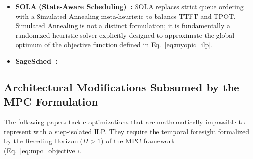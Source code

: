 \documentclass[11pt]{article}
\begin{document}
\begin{itemize}
    \item \textbf{SOLA (State-Aware Scheduling)~\citep{huang2025slo}:} SOLA replaces strict queue ordering with a Simulated Annealing meta-heuristic to balance TTFT and TPOT. Simulated Annealing is not a distinct formulation; it is fundamentally a randomized heuristic solver explicitly designed to approximate the global optimum of the objective function defined in Eq.~\ref{eq:myopic_ilp}.
    \item \textbf{SageSched~\citep{gan2026sagesched}:}
\end{itemize}

\subsection{Architectural Modifications Subsumed by the MPC Formulation}
\label{subsec:subsumed_mpc}

The following papers tackle optimizations that are mathematically impossible to represent with a step-isolated ILP. They require the temporal foresight formalized by the Receding Horizon ($H > 1$) of the MPC framework (Eq.~\ref{eq:mpc_objective}).
\end{document}
